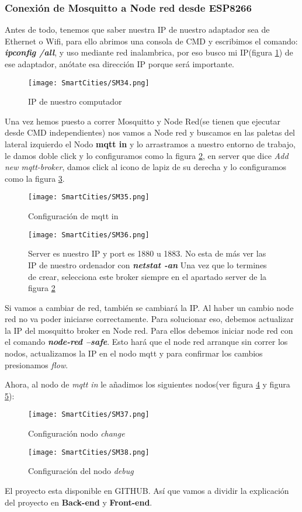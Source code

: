 \documentclass[
	12pt, %
	fleqn, %
	a4paper, %
	oneside, %
]{LegrandOrangeBook}
\begin{document}
\subsubsection{Conexión de Mosquitto a Node red desde ESP8266}
Antes de todo, tenemos que saber nuestra IP de nuestro adaptador sea de Ethernet o Wifi, para ello abrimos una consola de CMD y escribimos el comando: \textbf{\textit{ipconfig /all}}, y uso mediante red inalambrica, por eso busco mi IP(figura \ref{fig:IPlocal}) de ese adaptador, anótate esa dirección IP porque será importante.
\begin{figure}[H]
\centering\texttt{[image: SmartCities/SM34.png]}
\caption{IP de nuestro computador}
\label{fig:IPlocal}
\end{figure}
Una vez hemos puesto a correr Mosquitto y Node Red(se tienen que ejecutar desde CMD independientes) nos vamos a Node red y buscamos en las paletas del lateral izquierdo el Nodo \textbf{mqtt in} y lo arrastramos a nuestro entorno de trabajo, le damos doble click y lo configuramos como la figura \ref{fig:configmqttin}, en server que dice \textit{Add new mqtt-broker}, damos click al icono de lapiz de su derecha y lo configuramos como la figura \ref{fig:mqttconfignodered}.
\begin{figure}[H]
\centering\texttt{[image: SmartCities/SM35.png]}
\caption{Configuración de mqtt in}
\label{fig:configmqttin}
\end{figure}
\begin{figure}[H]
\centering\texttt{[image: SmartCities/SM36.png]}
\caption{Server es nuestro IP y port es 1880 u 1883. No esta de más ver las IP de nuestro ordenador con \textbf{\textit{netstat -an}} Una vez que lo termines de crear, selecciona este broker siempre en el apartado server de la figura \ref{fig:configmqttin}}
\label{fig:mqttconfignodered}
\end{figure}
\begin{remark}
Si vamos a cambiar de red, también se cambiará la IP. Al haber un cambio node red no va poder iniciarse correctamente. Para solucionar eso, debemos actualizar la IP del mosquitto broker en Node red. Para ellos debemos iniciar node red con el comando \textbf{\textit{node-red --safe}}. Esto hará que el node red arranque sin correr los nodos, actualizamos la IP en el nodo mqtt y para confirmar los cambios presionamos \textit{flow}.
\end{remark}
Ahora, al nodo de \textit{mqtt in} le añadimos los siguientes nodos(ver figura \ref{fig:configchange} y figura \ref{fig:configdebug}):
\begin{figure}[H]
\centering\texttt{[image: SmartCities/SM37.png]}
\caption{Configuración nodo \textit{change}}
\label{fig:configchange}
\end{figure}
\begin{figure}[H]
\centering\texttt{[image: SmartCities/SM38.png]}
\caption{Configuración del nodo \textit{debug}}
\label{fig:configdebug}
\end{figure}
\newpage
El proyecto esta disponible en GITHUB. Así que vamos a dividir la explicación del proyecto en \textbf{Back-end} y \textbf{Front-end}.
\pagebreak
\end{document}

